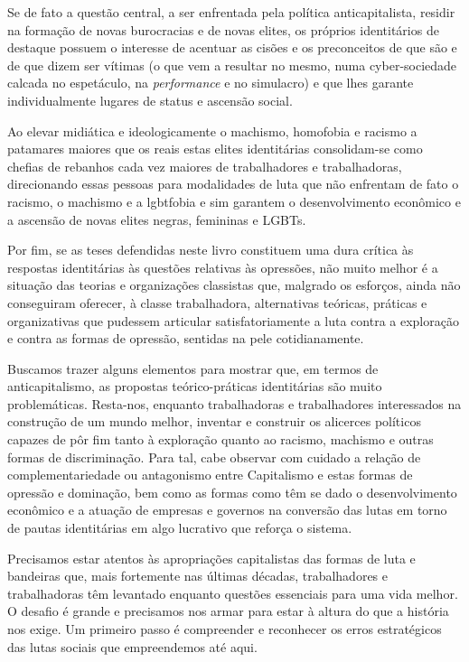 Se de fato a questão central, a ser enfrentada pela política
anticapitalista, residir na formação de novas burocracias e de novas
elites, os próprios identitários de destaque possuem o interesse de
acentuar as cisões e os preconceitos de que são e de que dizem ser
vítimas (o que vem a resultar no mesmo, numa cyber-sociedade calcada no
espetáculo, na \emph{performance} e no simulacro) e que lhes garante
individualmente lugares de status e ascensão social.

Ao elevar midiática e ideologicamente o machismo, homofobia e racismo a
patamares maiores que os reais estas elites identitárias consolidam-se
como chefias de rebanhos cada vez maiores de trabalhadores e
trabalhadoras, direcionando essas pessoas para modalidades de luta que
não enfrentam de fato o racismo, o machismo e a lgbtfobia e sim garantem
o desenvolvimento econômico e a ascensão de novas elites negras,
femininas e LGBTs.

Por fim, se as teses defendidas neste livro constituem uma dura crítica
às respostas identitárias às questões relativas às opressões, não muito
melhor é a situação das teorias e organizações classistas que, malgrado
os esforços, ainda não conseguiram oferecer, à classe trabalhadora,
alternativas teóricas, práticas e organizativas que pudessem articular
satisfatoriamente a luta contra a exploração e contra as formas de
opressão, sentidas na pele cotidianamente.

Buscamos trazer alguns elementos para mostrar que, em termos de
anticapitalismo, as propostas teórico-práticas identitárias são muito
problemáticas. Resta-nos, enquanto trabalhadoras e trabalhadores
interessados na construção de um mundo melhor, inventar e construir os
alicerces políticos capazes de pôr fim tanto à exploração quanto ao
racismo, machismo e outras formas de discriminação. Para tal, cabe
observar com cuidado a relação de complementariedade ou antagonismo
entre Capitalismo e estas formas de opressão e dominação, bem como as
formas como têm se dado o desenvolvimento econômico e a atuação de
empresas e governos na conversão das lutas em torno de pautas
identitárias em algo lucrativo que reforça o sistema.

Precisamos estar atentos às apropriações capitalistas das formas de luta
e bandeiras que, mais fortemente nas últimas décadas, trabalhadores e
trabalhadoras têm levantado enquanto questões essenciais para uma vida
melhor. O desafio é grande e precisamos nos armar para estar à altura do
que a história nos exige. Um primeiro passo é compreender e reconhecer
os erros estratégicos das lutas sociais que empreendemos até aqui.

